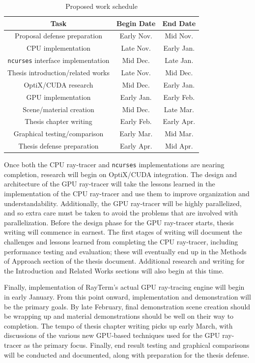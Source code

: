 \documentclass[11pt]{article}
\newcommand{\name}{{\sc RayTerm}}
\begin{document}
\begin{table}[htb]
  \vspace*{0.6em}
  \centering
  \begin{tabular}{|c||c|c|}
    \hline
    \textbf{Task} & \textbf{Begin Date} & \textbf{End Date} \\\hline\hline
    Proposal defense preparation & Early Nov. & Mid Nov. \\\hline
    CPU implementation & Late Nov. & Early Jan. \\\hline
    \texttt{ncurses} interface implementation & Mid Dec. & Late Jan. \\\hline
    Thesis introduction/related works & Late Nov. & Mid Dec. \\\hline
    OptiX/CUDA research & Mid Dec. & Early Jan. \\\hline
    GPU implementation & Early Jan. & Early Feb. \\\hline
    Scene/material creation & Mid Dec. & Late Mar. \\\hline
    Thesis chapter writing & Early Feb. & Early Apr. \\\hline
    Graphical testing/comparison & Early Mar. & Mid Mar. \\\hline
    Thesis defense preparation & Early Apr. & Mid Apr. \\\hline
  \end{tabular}
  \caption{Proposed work schedule}
  \label{worktable}
\end{table}

Once both the CPU ray-tracer and \texttt{ncurses} implementations are nearing completion, research will begin on OptiX/CUDA integration.
The design and architecture of the GPU ray-tracer will take the lessons learned in the implementation of the CPU ray-tracer and use them to improve organization and understandability.
Additionally, the GPU ray-tracer will be highly parallelized, and so extra care must be taken to avoid the problems that are involved with parallelization.
Before the design phase for the GPU ray-tracer starts, thesis writing will commence in earnest.
The first stages of writing will document the challenges and lessons learned from completing the CPU ray-tracer, including performance testing and evaluation; these will eventually end up in the Methods of Approach section of the thesis document.
Additional research and writing for the Introduction and Related Works sections will also begin at this time.

Finally, implementation of \name's actual GPU ray-tracing engine will begin in early January.
From this point onward, implementation and demonstration will be the primary goals.
By late February, final demonstration scene creation should be wrapping up and material demonstrations should be well on their way to completion.
The tempo of thesis chapter writing picks up early March, with discussions of the various new GPU-based techniques used for the GPU ray-tracer as the primary focus.
Finally, end result testing and graphical comparisons will be conducted and documented, along with preparation for the thesis defense.
\end{document}
